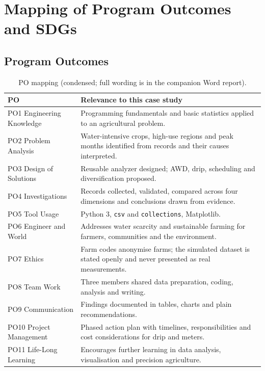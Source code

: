 \documentclass[11pt,a4paper]{article}
\begin{document}
\section{Mapping of Program Outcomes and SDGs}
\subsection{Program Outcomes}
\begin{table}[h]
\centering\small
\caption{PO mapping (condensed; full wording is in the companion Word report).}
\begin{tabular}{>{\raggedright\arraybackslash}p{3.6cm}
  >{\raggedright\arraybackslash}p{11.3cm}}
\toprule
PO & Relevance to this case study \\
\midrule
PO1 Engineering Knowledge & Programming fundamentals and basic statistics applied
  to an agricultural problem. \\
PO2 Problem Analysis & Water-intensive crops, high-use regions and peak months
  identified from records and their causes interpreted. \\
PO3 Design of Solutions & Reusable analyzer designed; AWD, drip, scheduling and
  diversification proposed. \\
PO4 Investigations & Records collected, validated, compared across four dimensions
  and conclusions drawn from evidence. \\
PO5 Tool Usage & Python 3, \texttt{csv} and \texttt{collections}, Matplotlib. \\
PO6 Engineer and World & Addresses water scarcity and sustainable farming for
  farmers, communities and the environment. \\
PO7 Ethics & Farm codes anonymise farms; the simulated dataset is stated openly
  and never presented as real measurements. \\
PO8 Team Work & Three members shared data preparation, coding, analysis and writing. \\
PO9 Communication & Findings documented in tables, charts and plain recommendations. \\
PO10 Project Management & Phased action plan with timelines, responsibilities and
  cost considerations for drip and meters. \\
PO11 Life-Long Learning & Encourages further learning in data analysis,
  visualisation and precision agriculture. \\
\bottomrule
\end{tabular}
\end{table}
\end{document}
